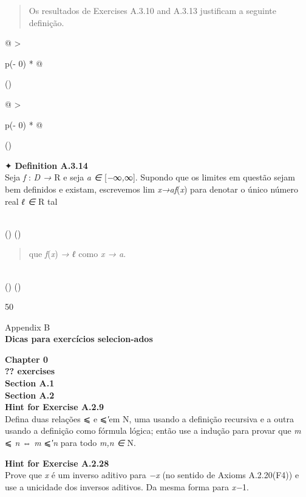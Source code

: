 \documentclass[
]{article}
\begin{document}
\begin{quote}
Os resultados de Exercises A.3.10 and A.3.13 justificam a seguinte
definição.
\end{quote}

\begin{longtable}[]{@{}
  >{\raggedright\arraybackslash}p{(\columnwidth - 0\tabcolsep) * }@{}}
\toprule()
\begin{minipage}[b]{\linewidth}\raggedright
\begin{longtable}[]{@{}
  >{\raggedright\arraybackslash}p{(\columnwidth - 0\tabcolsep) * }@{}}
\toprule()
\begin{minipage}[b]{\linewidth}\raggedright
✦ \textbf{Definition A.3.14}\\
Seja \emph{f} : \emph{D →} R e seja \emph{a ∈} {[}\emph{−}∞\emph{,}∞{]}.
Supondo que os limites em questão sejam bem definidos e existam,
escrevemos lim \emph{x→af}(\emph{x}) para denotar o único número real
\emph{ℓ ∈} R tal\strut
\end{minipage} \\
\midrule()
\endhead
\bottomrule()
\end{longtable}

\begin{quote}
que \emph{f}(\emph{x}) \emph{→ ℓ} como \emph{x → a}.
\end{quote}\strut
\end{minipage} \\
\midrule()
\endhead
\bottomrule()
\end{longtable}

50

Appendix B\\
\textbf{Dicas para exercícios selecion-ados}

\textbf{Chapter 0}\\
\textbf{?? exercises}\\
\textbf{Section A.1}\\
\textbf{Section A.2}\\
\textbf{Hint for Exercise A.2.9}\\
Defina duas relações ⩽ e ⩽\emph{′}em N, uma usando a definição recursiva
e a outra usando a definição como fórmula lógica; então use a indução
para provar que \emph{m} ⩽ \emph{n ⇔ m} ⩽\emph{′n} para todo \emph{m,n
∈} N.

\textbf{Hint for Exercise A.2.28}\\
Prove que \emph{x} é um inverso aditivo para \emph{−x} (no sentido de
Axioms A.2.20(F4)) e use a unicidade dos inversos aditivos. Da mesma
forma para \emph{x−}1.
\end{document}
